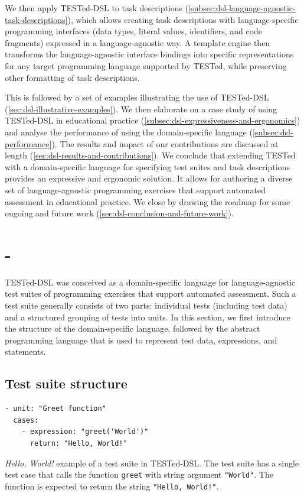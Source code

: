 \documentclass[../main]{subfiles}
\begin{document}
We then apply TESTed-DSL to task descriptions (\cref{subsec:dsl-language-agnostic-task-descriptions}), which allows creating task descriptions with language-specific programming interfaces (data types, literal values, identifiers, and code fragments) expressed in a language-agnostic way.
A template engine then transforms the language-agnostic interface bindings into specific representations for any target programming language supported by TESTed, while preserving other formatting of task descriptions.

This is followed by a set of examples illustrating the use of TESTed-DSL (\cref{sec:dsl-illustrative-examples}).
We then elaborate on a case study of using TESTed-DSL in educational practice (\cref{subsec:dsl-expressiveness-and-ergonomics}) and analyse the performance of using the domain-specific language (\cref{subsec:dsl-performance}).
The results and impact of our contributions are discussed at length (\cref{sec:dsl-results-and-contributions}).
We conclude that extending TESTed with a domain-specific language for specifying test suites and task descriptions provides an expressive and ergonomic solution.
It allows for authoring a diverse set of language-agnostic programming exercises that support automated assessment in educational practice.
We close by drawing the roadmap for some ongoing and future work (\cref{sec:dsl-conclusion-and-future-work}).

\section{\tested{}-\dsl{}}\label{sec:tested-dsl}

TESTed-DSL was conceived as a domain-specific language for language-agnostic test suites of programming exercises that support automated assessment.
Such a test suite generally consists of two parts: individual tests (including test data) and a structured grouping of tests into units.
In this section, we first introduce the structure of the domain-specific language, followed by the abstract programming language that is used to represent test data, expressions, and statements.

\subsection{Test suite structure}\label{subsec:dsl-test-suite-structure}

\begin{listing}
    \begin{verbatim}
- unit: "Greet function"
  cases:
    - expression: "greet('World')"
      return: "Hello, World!"
    \end{verbatim}
    \caption[]{
        \textit{Hello, World!} example of a test suite in TESTed-DSL\@.
        The test suite has a single test case that calls the function \texttt{greet} with string argument \texttt{"World"}.
        The function is expected to return the string \texttt{"Hello, World!"}.
    }
    \label{lst:yaml-basic-example}
\end{listing}
\end{document}
